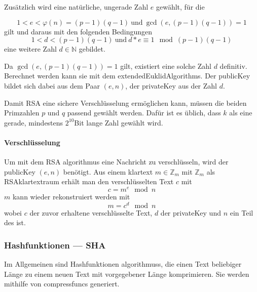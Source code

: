 Zusätzlich wird eine natürliche, ungerade Zahl $e$ gewählt, für die

\begin{equation}
    1 < e < \varphi(n) = (p - 1)(q - 1)\ \text{und}\ \gcd(e, (p-1)(q-1)) = 1\label{eq:equation2}
\end{equation}
gilt und daraus mit den folgenden Bedingungen
\begin{equation}
    1 < d < (p-1)(q-1)\ \text{und}\ d*e \equiv 1\mod(p-1)(q-1)\label{eq:equation3}
\end{equation}
eine weitere Zahl \(d \in \mathbb{N}\) gebildet.

Da $\gcd(e, (p-1)(q-1)) = 1$ gilt, existiert eine solche Zahl $d$ definitiv.
Berechnet werden kann sie mit dem \glspl{extendedEuklidAlgorithm}.
Der \gls{publicKey} bildet sich dabei aus dem Paar $(e, n)$, der \gls{privateKey} aus der Zahl $d$.\autocite[\pagef~169]{buchmann-einfuhrung-2016}

Damit \ac{RSA} eine sichere Verschlüsselung ermöglichen kann, müssen die beiden Primzahlen $p$ und $q$ passend gewählt werden.
Dafür ist es üblich, dass $k$ als eine gerade, mindestens $2^{10}$\nonbreakdash Bit lange Zahl gewählt wird.\autocite[\pagef~169]{buchmann-einfuhrung-2016}

\paragraph{Verschlüsselung}\label{par:verschluesselung}
Um mit dem \ac{RSA} \gls{algorithmus} eine Nachricht zu verschlüsseln, wird der \gls{publicKey} $(e, n)$ benötigt.
Aus einem \gls{klartext} \(m \in \mathbb{Z}_m\) mit \(\mathbb{Z}_m\) als \ac{RSA}\nonbreakdash\gls{klartextraum} erhält man den verschlüsselten Text $c$ mit
\begin{equation}
    c = m^e\mod n\label{eq:equation4}
\end{equation}
$m$ kann wieder rekonstruiert werden mit
\begin{equation}
    m = c^d \mod n\label{eq:equation5}
\end{equation}
wobei $c$ der zuvor erhaltene verschlüsselte Text, $d$ der \gls{privateKey} und $n$ ein Teil des  ist.\autocite[\pagef~6]{rsa-encryption}

\subsubsection[Hashfunktionen]{Hashfunktionen — \acf{SHA}}\label{subsubsec:hash-funktion}
Im Allgemeinen sind Hashfunktionen \glspl{algorithmus}, die einen Text beliebiger Länge zu einem neuen Text mit vorgegebener Länge komprimieren\autocite[\pagef~15]{anal-des-hash-function-2003}.
Sie werden mithilfe von \sog \glspl{compressfunc} generiert.

